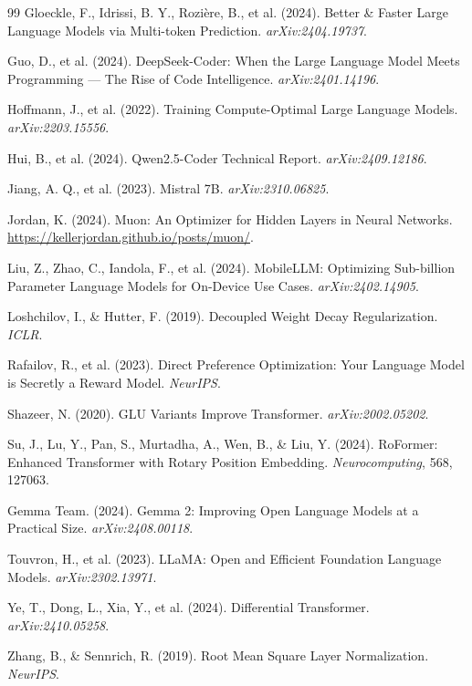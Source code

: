 \documentclass[11pt,a4paper]{article}
\theoremstyle{definition}
\theoremstyle{remark}
\begin{document}
\begin{thebibliography}{99}
Gloeckle, F., Idrissi, B. Y., Rozi\`ere, B., et al. (2024). Better \&
Faster Large Language Models via Multi-token Prediction.
\emph{arXiv:2404.19737}.

Guo, D., et al. (2024). DeepSeek-Coder: When the Large Language Model
Meets Programming --- The Rise of Code Intelligence.
\emph{arXiv:2401.14196}.

Hoffmann, J., et al. (2022). Training Compute-Optimal Large Language
Models. \emph{arXiv:2203.15556}.

Hui, B., et al. (2024). Qwen2.5-Coder Technical Report.
\emph{arXiv:2409.12186}.

Jiang, A. Q., et al. (2023). Mistral 7B. \emph{arXiv:2310.06825}.

Jordan, K. (2024). Muon: An Optimizer for Hidden Layers in Neural
Networks. \url{https://kellerjordan.github.io/posts/muon/}.

Liu, Z., Zhao, C., Iandola, F., et al. (2024). MobileLLM: Optimizing
Sub-billion Parameter Language Models for On-Device Use Cases.
\emph{arXiv:2402.14905}.

Loshchilov, I., \& Hutter, F. (2019). Decoupled Weight Decay
Regularization. \emph{ICLR}.

Rafailov, R., et al. (2023). Direct Preference Optimization: Your
Language Model is Secretly a Reward Model. \emph{NeurIPS}.

Shazeer, N. (2020). GLU Variants Improve Transformer.
\emph{arXiv:2002.05202}.

Su, J., Lu, Y., Pan, S., Murtadha, A., Wen, B., \& Liu, Y. (2024).
RoFormer: Enhanced Transformer with Rotary Position Embedding.
\emph{Neurocomputing}, 568, 127063.

Gemma Team. (2024). Gemma 2: Improving Open Language Models at a
Practical Size. \emph{arXiv:2408.00118}.

Touvron, H., et al. (2023). LLaMA: Open and Efficient Foundation
Language Models. \emph{arXiv:2302.13971}.

Ye, T., Dong, L., Xia, Y., et al. (2024). Differential Transformer.
\emph{arXiv:2410.05258}.

Zhang, B., \& Sennrich, R. (2019). Root Mean Square Layer Normalization.
\emph{NeurIPS}.

\end{thebibliography}
\end{document}
